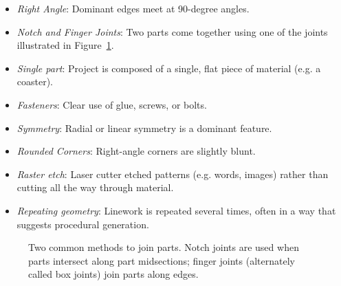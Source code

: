 \documentclass{article}
\begin{document}
\begin{itemize}
\item \textit{Right Angle}: Dominant edges meet at 90-degree angles.
\item \textit{Notch and Finger Joints}: Two parts come together using one of
  the joints illustrated in Figure~\ref{fig:joint}.
\item \textit{Single part}: Project is composed of a single, flat piece of
  material (e.g. a coaster).
\item \textit{Fasteners}: Clear use of glue, screws, or bolts.
\item \textit{Symmetry}: Radial or linear symmetry is a dominant feature.
\item \textit{Rounded Corners}: Right-angle corners are slightly blunt.
\item \textit{Raster etch}: Laser cutter etched patterns (e.g. words,
  images) rather than cutting all the way through material.
\item \textit{Repeating geometry}: Linework is repeated several times,
  often in a way that suggests procedural generation.
\end{itemize}

\begin{figure}[h]
\centering 
{}
\caption{Two common methods to join parts. Notch joints are used when
  parts intersect along part midsections; finger joints (alternately
  called box joints) join parts along edges.}
\label{fig:joint}
\end{figure}
\end{document}
